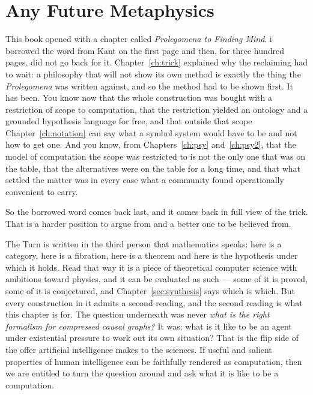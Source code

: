 \chapter{Any Future Metaphysics}
\label{ch:kant}

This book opened with a chapter called \emph{Prolegomena to Finding
Mind}.
i borrowed the word from Kant on the first page and then, for three
hundred pages, did not go back for it.
Chapter~\ref{ch:trick} explained why the reclaiming had to wait:
a philosophy that will not show its own method is exactly the thing
the \emph{Prolegomena} was written against, and so the method had
to be shown first.
It has been.
You know now that the whole construction was bought with a
restriction of scope to computation, that the restriction yielded
an ontology and a grounded hypothesis language for free, and that
outside that scope Chapter~\ref{ch:notation} can say what a symbol
system would have to be and not how to get one.
And you know, from Chapters~\ref{ch:psy} and~\ref{ch:psy2}, that
the model of computation the scope was restricted to is not the
only one that was on the table, that the alternatives were on the
table for a long time, and that what settled the matter was in
every case what a community found operationally convenient to
carry.

So the borrowed word comes back last, and it comes back in full
view of the trick.
That is a harder position to argue from and a better one to be
believed from.

The Turn is written in the third person that mathematics speaks:
here is a category, here is a fibration, here is a theorem and here
is the hypothesis under which it holds.
Read that way it is a piece of theoretical computer science with
ambitions toward physics, and it can be evaluated as such --- some
of it is proved, some of it is conjectured, and Chapter~\ref{sec:synthesis}
says which is which.
But every construction in it admits a second reading, and the
second reading is what this chapter is for.
The question underneath was never \emph{what is the right
formalism for compressed causal graphs?}
It was: what is it like to be an agent under existential pressure
to work out its own situation?
That is the flip side of the offer artificial intelligence makes
to the sciences.
If useful and salient properties of human intelligence can be
faithfully rendered as computation, then we are entitled to turn
the question around and ask what it is like to be a computation.

